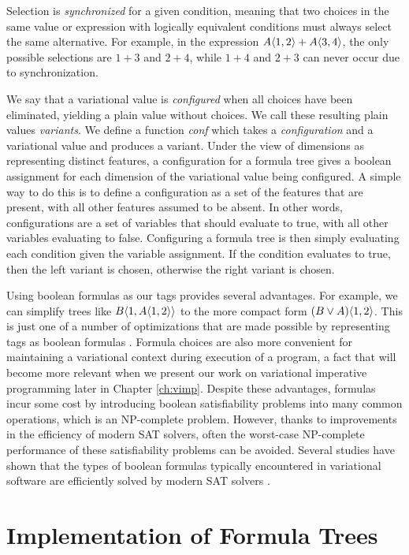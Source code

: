 \documentclass[12pt,oneside]{book}
\begin{document}
Selection is \emph{synchronized} for a given
condition, meaning that two choices in the same value or expression with logically equivalent conditions must always
select the same alternative. For example, in the expression $A \langle 1, 2 \rangle+A \langle 3, 4 \rangle$,
the only possible selections are $1+3$ and $2+4$, while $1+4$ and $2+3$ can never occur due
to synchronization.

We say that a variational value is \emph{configured} when all choices
have been eliminated, yielding a plain value without choices. We call these resulting plain values
\emph{variants}. We define a function \emph{conf} which takes a
\emph{configuration} and a variational value and produces a variant. Under the view of dimensions as representing distinct features, a configuration for a formula tree gives
a boolean assignment for each dimension of the variational value being configured.
A simple way to do this is to define a configuration as a set of the features that are present, with all
other features assumed to be absent. In other words, configurations are a set of variables that should
evaluate to true, with all other variables evaluating to false. Configuring a formula tree is then simply evaluating
each condition given the variable assignment. If the condition evaluates to true, then the left variant
is chosen, otherwise the right variant is chosen.

Using boolean formulas as our tags provides several advantages. For example, we can simplify trees like
$B \langle 1, A \langle 1, 2 \rangle \rangle$ to the more compact form $(B \vee A) \langle 1, 2 \rangle$. This is just
one of a number of optimizations that are made possible by representing tags as boolean formulas
\cite{WO14gpce,HW16fosd}. Formula choices are also more convenient
for maintaining a variational context during execution of a program, a fact that will become
more relevant when we present our work on variational imperative programming later in
Chapter \ref{ch:vimp}. Despite these advantages, formulas incur some cost by introducing boolean
satisfiability problems into many common operations, which is an NP-complete problem. However, thanks to improvements in the
efficiency of modern SAT solvers, often the worst-case NP-complete performance of these satisfiability
problems can be avoided. Several studies have shown that the types of boolean formulas typically encountered in
variational software are efficiently solved by modern SAT solvers \cite{liebig2013scalable,Mendonca:2009:SAF:1753235.1753267}.

\section{Implementation of Formula Trees}
\label{sec:genvimpl}
\end{document}
